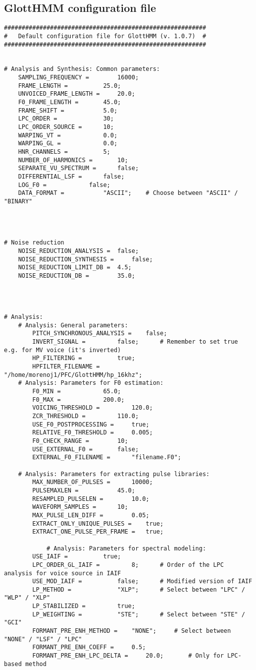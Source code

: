 \subsection{GlottHMM configuration file}
\label{glott_conf_file}

\begin{lstlisting}[caption = Configuration file]
#########################################################
#   Default configuration file for GlottHMM (v. 1.0.7)  #
#########################################################


# Analysis and Synthesis: Common parameters:
	SAMPLING_FREQUENCY = 		16000;
	FRAME_LENGTH = 			25.0;
	UNVOICED_FRAME_LENGTH = 	20.0;
	F0_FRAME_LENGTH = 		45.0;
	FRAME_SHIFT = 			5.0;
	LPC_ORDER = 			30;
	LPC_ORDER_SOURCE = 		10;
	WARPING_VT = 			0.0;
	WARPING_GL = 			0.0;
	HNR_CHANNELS = 			5;
	NUMBER_OF_HARMONICS = 		10;
	SEPARATE_VU_SPECTRUM = 		false;
	DIFFERENTIAL_LSF = 		false;
	LOG_F0 = 	 		false;
	DATA_FORMAT = 			"ASCII";	# Choose between "ASCII" / "BINARY"




# Noise reduction
	NOISE_REDUCTION_ANALYSIS = 	false;
	NOISE_REDUCTION_SYNTHESIS = 	false;
	NOISE_REDUCTION_LIMIT_DB = 	4.5;
	NOISE_REDUCTION_DB = 		35.0;




# Analysis:
	# Analysis: General parameters:
		PITCH_SYNCHRONOUS_ANALYSIS = 	false;
		INVERT_SIGNAL = 		false;  	# Remember to set true e.g. for MV voice (it's inverted)
		HP_FILTERING = 			true;
		HPFILTER_FILENAME = 		"/home/morenoj1/PFC/GlottHMM/hp_16khz";
	# Analysis: Parameters for F0 estimation:
		F0_MIN = 			65.0;
		F0_MAX = 			200.0;
		VOICING_THRESHOLD = 		120.0;
		ZCR_THRESHOLD = 		110.0;
		USE_F0_POSTPROCESSING = 	true;
		RELATIVE_F0_THRESHOLD = 	0.005;
		F0_CHECK_RANGE = 		10;
		USE_EXTERNAL_F0 = 		false;
		EXTERNAL_F0_FILENAME = 		"filename.F0";

	# Analysis: Parameters for extracting pulse libraries:
		MAX_NUMBER_OF_PULSES = 		10000;
		PULSEMAXLEN = 			45.0;
		RESAMPLED_PULSELEN = 		10.0;
		WAVEFORM_SAMPLES = 		10;
		MAX_PULSE_LEN_DIFF = 		0.05;
		EXTRACT_ONLY_UNIQUE_PULSES =	true;
		EXTRACT_ONE_PULSE_PER_FRAME =   true;

			# Analysis: Parameters for spectral modeling:
		USE_IAIF = 			true;
		LPC_ORDER_GL_IAIF = 		8;		# Order of the LPC analysis for voice source in IAIF
		USE_MOD_IAIF = 			false;		# Modified version of IAIF
		LP_METHOD = 			"XLP";		# Select between "LPC" / "WLP" / "XLP"
		LP_STABILIZED = 		true;
		LP_WEIGHTING = 			"STE";		# Select between "STE" / "GCI"
		FORMANT_PRE_ENH_METHOD = 	"NONE";		# Select between "NONE" / "LSF" / "LPC"
		FORMANT_PRE_ENH_COEFF = 	0.5;
		FORMANT_PRE_ENH_LPC_DELTA = 	20.0;		# Only for LPC-based method


\end{lstlisting}
